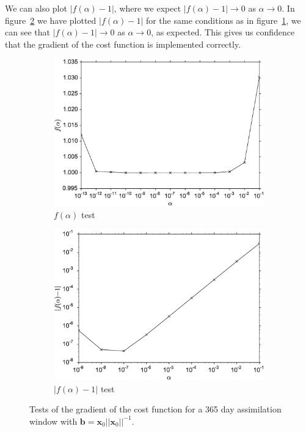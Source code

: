 \documentclass[review]{elsarticle}
\begin{document}
We can also plot $|f(\alpha)-1|$, where we expect $|f(\alpha)-1| \rightarrow 0$ as $\alpha \rightarrow 0$.  In figure~\ref{fig:cost} we have plotted $|f(\alpha)-1|$ for the same conditions as in figure~\ref{fig:costone}, we can see that $|f(\alpha) - 1| \rightarrow 0$ as $\alpha \rightarrow 0$, as expected. This gives us confidence that the gradient of the cost function is implemented correctly.

\begin{figure}[ht]
    \centering
    \begin{subfigure}[b]{0.49\textwidth}
        \includegraphics[width=\textwidth]{costone_cvt.eps}
        \caption{$f(\alpha)$ test}
        \label{fig:costone}
    \end{subfigure}
    \begin{subfigure}[b]{0.49\textwidth}
        \includegraphics[width=\textwidth]{cost_cvt.eps}
        \caption{$|f(\alpha) - 1|$ test}
        \label{fig:cost}
    \end{subfigure}
    \caption{Tests of the gradient of the cost function for a 365 day assimilation window with $\textbf{b}=\textbf{x}_0||\textbf{x}_0||^{-1}$.}
    \label{fig:testgradcostone}
\end{figure}
\end{document}
